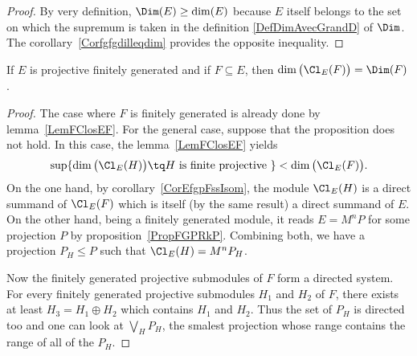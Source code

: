 \begin{proof}
By very definition, $\Dim(E)\geq\dim(E)$ because $E$ itself belongs to the set on which the supremum is taken in the definition \eqref{DefDimAvecGrandD} of $\Dim$. The corollary~\ref{Corfgfgdilleqdim} provides the opposite inequality.
\end{proof}

\begin{proposition}		\label{PropProjFiniDimCldim}
If $E$ is projective finitely generated and if $F\subseteq E$, then $\dim\big( \Cl_E(F) \big)=\Dim(F)$.
\end{proposition}

\begin{proof}
The case where $F$ is finitely generated is already done by lemma~\ref{LemFClosEF}. For the general case, suppose that the proposition does not hold. In this case, the lemma~\ref{LemFClosEF} yields
\begin{equation}
    \sup\{ \dim\big( \Cl_E(H) \big)\tq H \text{ is finite projective } \}<\dim\big( \Cl_E(F) \big).
\end{equation}
On the one hand, by corollary~\ref{CorEfgpFssIsom}, the module $\Cl_E(H)$ is a direct summand of $\Cl_E(F)$ which is itself (by the same result) a direct summand of $E$. On the other hand, being a finitely generated module, it reads $E=M^nP$ for some projection $P$ by proposition~\ref{PropFGPRkP}. Combining both, we have a projection $P_H\leq P$ such that $\Cl_E(H)=M^nP_H$.

Now the finitely generated projective submodules of $F$ form a directed system. For every finitely generated projective submodules $H_1$ and $H_2$ of $F$, there exists at least $H_3=H_1\oplus H_2$ which contains $H_1$ and $H_2$. Thus the set of $P_H$ is directed too and one can look at $\bigvee_HP_H$, the smalest projection whose range contains the range of all of the $P_H$.


\end{proof}
